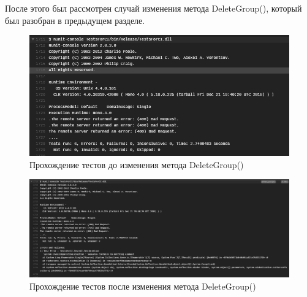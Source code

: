 После этого был рассмотрен случай изменения метода DeleteGroup(), который был разобран в предыдущем разделе.
\begin{figure}
	\centering
	\includegraphics[scale=1]{Before.PNG}
	\caption{Прохождение тестов до изменения метода DeleteGroup()}
	\label{image:beforedelete-edit}
\end{figure}

\begin{figure}
	\centering
	\includegraphics[scale=1]{After.PNG}
	\caption{Прохождение тестов после изменения метода DeleteGroup()}
	\label{image:afterdelete-edit}
\end{figure}

